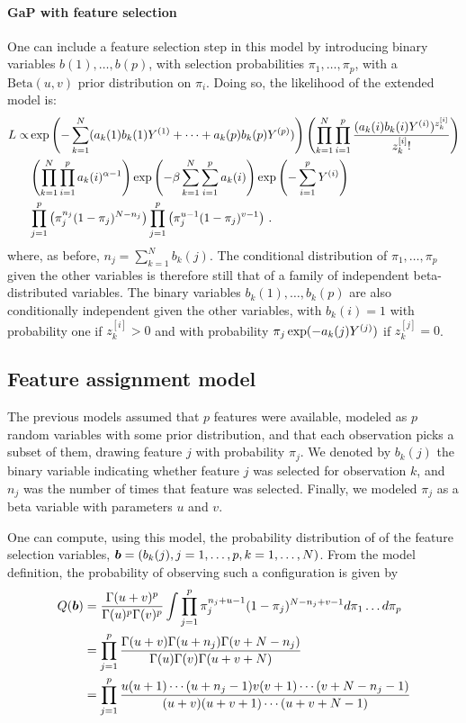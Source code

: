 \paragraph{GaP with feature selection}
One can include a feature selection step in this model by introducing binary variables $b(1), \ldots, b(p)$, with selection probabilities $\pi_1, \ldots, \pi_p$, with a $\mathrm{Beta}(u,v)$ prior distribution on $\pi_i$. Doing so, the likelihood of the extended model is:
\begin{align*}
L \propto & \exp\left(-\sum_{k=1}^N (a_k(1)b_k(1) Y^{(1)} + \cdots + a_k(p) b_k(p)Y^{(p)})\right) \left(\prod_{k=1}^N \prod_{i=1}^p \frac{(a_k(i) b_k(i) Y^{(i)})^{z_k^{[i]}}}{z^{[i]}_k!}\right)\\
& \left(\prod_{k=1}^N \prod_{i=1}^p a_k(i)^{\alpha-1}\right) \exp\left(-\beta \sum_{k=1}^N\sum_{i=1}^p a_k(i)\right) \exp\left(- \sum_{i=1}^p Y^{(i)}\right) \\
& \prod_{j=1}^p \left(\pi_j^{n_j} (1-\pi_j)^{N-n_j}\right)  \prod_{j=1}^p \left(\pi_j^{u-1} (1-\pi_j)^{v-1}\right) \,.
\end{align*}
where, as before, $n_j = \sum_{k=1}^N b_k(j)$. The conditional distribution of $\pi_1, \ldots, \pi_p$ given the other variables is therefore still that of a family of independent beta-distributed variables. The binary variables $b_k(1), \ldots, b_k(p)$ are also conditionally independent  given the other variables, with $b_k(i) = 1$ with probability one if $z_k^{[i]} > 0$ and with probability $\pi_j \exp(- a_k(j) Y^{(j)})$ if $z_k^{[j]} = 0$.

\subsection{Feature assignment model}
\label{sec:indian.buffet}
The previous models assumed that $p$ features were available, modeled as $p$ random variables with some prior distribution, and that each observation picks a subset of them, drawing feature $j$ with probability $\pi_j$. We denoted by $b_k(j)$ the binary variable indicating whether feature $j$ was selected for observation $k$, and $n_j$ was the number of times that feature was selected. Finally, we modeled $\pi_j$ as a beta variable with parameters $u$ and $v$.

One can compute, using this model, the probability distribution of of the feature selection variables, ${\bm{b}} = (b_k(j), j=1, \ldots, p, k=1, \ldots, N)$. From the model definition, the probability of observing such a configuration is given by
\begin{align*}
Q({\bm{b}}) &= \frac{\Gamma(u+v)^p}{\Gamma(u)^p\Gamma(v)^p} \int \prod_{j=1}^p \pi_j^{n_j + u-1} (1-\pi_j)^{N-n_j + v-1} d\pi_1 \ldots d\pi_p\\
&= \prod_{j=1}^p  \frac{\Gamma(u+v) \Gamma(u+n_j) \Gamma(v+N-n_j)}{\Gamma(u)\Gamma(v)\Gamma(u+v+N)}\\
&= \prod_{j=1}^p \frac{u(u+1) \cdots (u+n_j-1)v(v+1)\cdots(v+N-n_j-1)}{(u+v)(u+v+1) \cdots (u+v + N-1)}
\end{align*}

